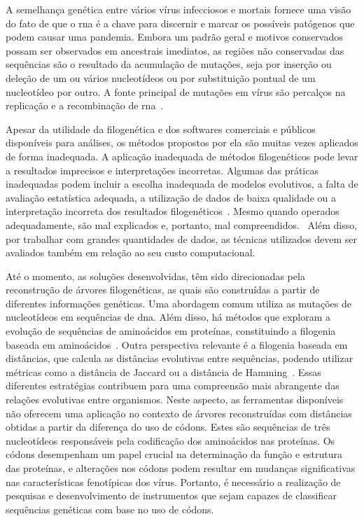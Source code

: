 A semelhança genética entre vários vírus infecciosos e mortais fornece uma visão do fato de que o \gls{rna} é a chave para discernir e marcar os possíveis patógenos que podem causar uma pandemia. Embora um padrão geral e motivos conservados possam ser observados em ancestrais imediatos, as regiões não conservadas das sequências são o resultado da acumulação de mutações, seja por inserção ou deleção de um ou vários nucleotídeos ou por substituição pontual de um nucleotídeo por outro. A fonte principal de mutações em vírus são percalços na replicação e a recombinação de \gls{rna}~\cite{behl_threat_2022}.

Apesar da utilidade da filogenética e dos softwares comerciais e públicos disponíveis para análises, os métodos propostos por ela são muitas vezes aplicados de forma inadequada. A aplicação inadequada de métodos filogenéticos pode levar a resultados imprecisos e interpretações incorretas. Algumas das práticas inadequadas podem incluir a escolha inadequada de modelos evolutivos, a falta de avaliação estatística adequada, a utilização de dados de baixa qualidade ou a interpretação incorreta dos resultados filogenéticos~\cite{felsenstein_inferring_2004,mrbayes_huelsenbeck_2001}. Mesmo quando operados adequadamente, são mal explicados e, portanto, mal compreendidos.~\cite[p. 1]{barry_phylogenetic_analysis_2006} Além disso, por trabalhar com grandes quantidades de dados, as técnicas utilizados devem ser avaliados também em relação ao seu custo computacional.

Até o momento, as soluções desenvolvidas, têm sido direcionadas pela reconstrução de árvores filogenéticas, as quais são construídas a partir de diferentes informações genéticas. Uma abordagem comum utiliza as mutações de nucleotídeos em sequências de \gls{dna}. Além disso, há métodos que exploram a evolução de sequências de aminoácidos em proteínas, constituindo a filogenia baseada em aminoácidos~\cite{protein_le_2008}. Outra perspectiva relevante é a filogenia baseada em distâncias, que calcula as distâncias evolutivas entre sequências, podendo utilizar métricas como a distância de Jaccard ou a distância de Hamming~\cite{sokal_statistical_method_1958}. Essas diferentes estratégias contribuem para uma compreensão mais abrangente das relações evolutivas entre organismos. Neste aspecto, as ferramentas disponíveis não oferecem uma aplicação no contexto de árvores reconstruídas com distâncias obtidas a partir da diferença do uso de códons. Estes são sequências de três nucleotídeos responsáveis pela codificação dos aminoácidos nas proteínas. Os códons desempenham um papel crucial na determinação da função e estrutura das proteínas, e alterações nos códons podem resultar em mudanças significativas nas características fenotípicas dos vírus. Portanto, é necessário a realização de pesquisas e desenvolvimento de instrumentos que sejam capazes de classificar sequências genéticas com base no uso de códons.

